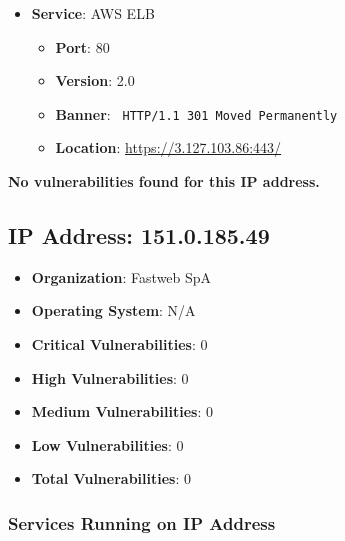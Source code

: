 \documentclass{article}
\begin{document}
\begin{itemize}
    
        \item \textbf{Service}: AWS ELB
        \begin{itemize}
            \item \textbf{Port}: 80
            \item \textbf{Version}:  2.0 
            \item \textbf{Banner}: \texttt{ HTTP/1.1 301 Moved Permanently
 }
            \item \textbf{Location}: \href{ https://3.127.103.86:443/ }{ https://3.127.103.86:443/ }
        \end{itemize}
    
\end{itemize}


\textbf{No vulnerabilities found for this IP address.}


\clearpage



\subsection*{IP Address: 151.0.185.49}

\begin{itemize}
    \item \textbf{Organization}: Fastweb SpA
    \item \textbf{Operating System}:  N/A 
    \item \textbf{Critical Vulnerabilities}: 0
    \item \textbf{High Vulnerabilities}: 0
    \item \textbf{Medium Vulnerabilities}: 0
    \item \textbf{Low Vulnerabilities}: 0
    \item \textbf{Total Vulnerabilities}: 0
\end{itemize}

\subsubsection*{Services Running on IP Address}
\end{document}
